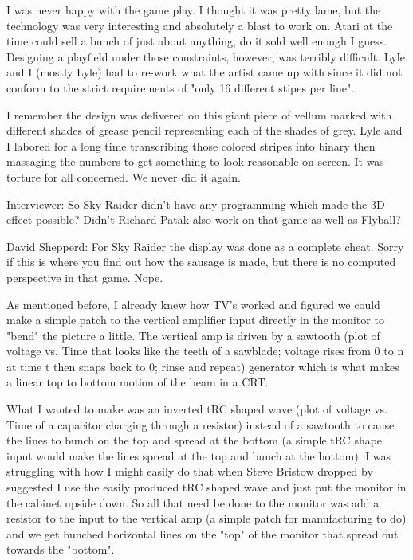 I was never happy with the game play. I thought it was pretty lame, but the technology was very interesting and absolutely a blast to work on. Atari at the time could sell a bunch of just about anything, do it sold well enough I guess. Designing a playfield under those constraints, however, was terribly difficult. Lyle and I (mostly Lyle) had to re-work what the artist came up with since it did not conform to the strict requirements of "only 16 different stipes per line". 

I remember the design was delivered on this giant piece of vellum marked with different shades of grease pencil representing each of the shades of grey. Lyle and I labored for a long time transcribing those colored stripes into binary then massaging the numbers to get something to look reasonable on screen. It was torture for all concerned. We never did it again.

\textcolor{interviewer}{Interviewer:} So Sky Raider didn’t have any programming which made the 3D effect possible? Didn’t Richard Patak also work on that game as well as Flyball?

\textcolor{interviewee}{David Shepperd:} For Sky Raider the display was done as a complete cheat. Sorry if this is where you find out how the sausage is made, but there is no computed perspective in that game. Nope. 

As mentioned before, I already knew how TV's worked and figured we could make a simple patch to the vertical amplifier input directly in the monitor to "bend" the picture a little. The vertical amp is driven by a sawtooth (plot of voltage vs. Time that looks like the teeth of a sawblade; voltage rises from 0 to n at time t then snaps back to 0; rinse and repeat) generator which is what makes a linear top to bottom motion of the beam in a CRT. 

What I wanted to make was an inverted tRC shaped wave (plot of voltage vs. Time of a capacitor charging through a resistor) instead of a sawtooth to cause the lines to bunch on the top and spread at the bottom (a simple tRC shape input would make the lines spread at the top and bunch at the bottom). I was struggling with how I might easily do that when Steve Bristow dropped by suggested I use the easily produced tRC shaped wave and just put the monitor in the cabinet upside down. So all that need be done to the monitor was add a resistor to the input to the vertical amp (a simple patch for manufacturing to do) and we get bunched horizontal lines on the "top" of the monitor that spread out towards the "bottom". 

